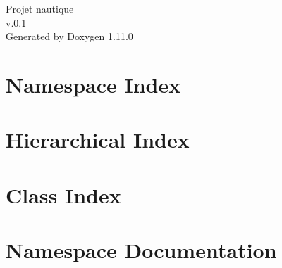 \documentclass[twoside]{book}
\newcommand{\+}{\discretionary{\mbox{\scriptsize$\hookleftarrow$}}{}{}}
\newcommand{\clearemptydoublepage}{%
    \newpage{\pagestyle{empty}\cleardoublepage}%
  }
\begin{document}
  \raggedbottom
    \hypersetup{pageanchor=false,
                bookmarksnumbered=true,
                pdfencoding=unicode
               }
  \begin{titlepage}
  \vspace*{7cm}
  \begin{center}%
  {\Large Projet nautique}\\
  [1ex]\large v.\+0.\+1 \\
  \vspace*{1cm}
  {\large Generated by Doxygen 1.11.0}\\
  \end{center}
  \end{titlepage}
  \clearemptydoublepage
  \tableofcontents
  \clearemptydoublepage
  \hypersetup{pageanchor=true}

\chapter{Namespace Index}

\chapter{Hierarchical Index}

\chapter{Class Index}

\chapter{Namespace Documentation}














\end{document}
